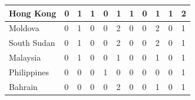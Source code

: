 \documentclass[12pt]{article}  %
\begin{document}
\begin{subappendices}
\begin{longtable}{|l|l|l|l|l|l|l|l|l|l|l|}
	\hline
	Hong Kong                                                      & 0                                                 & 1                                                 & 1                                                 & 0                                                 & 1                                                 & 1                                                 & 0    & 1      & 1      & 2      \\ 
	\hline
	Moldova                                                        & 0                                                 & 1                                                 & 0                                                 & 0                                                 & 2                                                 & 0                                                 & 0    & 2      & 0      & 1      \\ 
	\hline
	South Sudan                                                    & 0                                                 & 1                                                 & 0                                                 & 0                                                 & 2                                                 & 0                                                 & 0    & 2      & 0      & 1      \\ 
	\hline
	Malaysia                                                       & 0                                                 & 1                                                 & 0                                                 & 0                                                 & 1                                                 & 0                                                 & 0    & 1      & 0      & 1      \\ 
	\hline
	Philippines                                                    & 0                                                 & 0                                                 & 0                                                 & 1                                                 & 0                                                 & 0                                                 & 0    & 0      & 0      & 1      \\ 
	\hline
	Bahrain                                                        & 0                                                 & 0                                                 & 0                                                 & 0                                                 & 2                                                 & 0                                                 & 0    & 1      & 0      & 1      \\ 

\end{longtable}
\end{subappendices}
\end{document}

